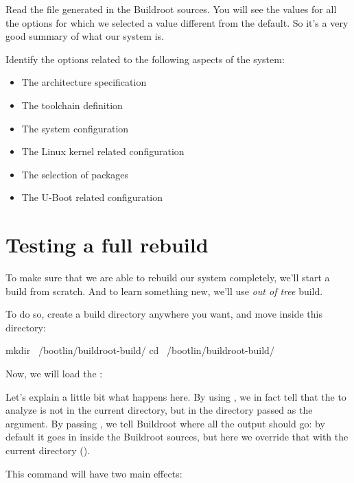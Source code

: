 Read the file  generated in the
Buildroot sources. You will see the values for all the options for
which we selected a value different from the default. So it's a very
good summary of what our system is.

Identify the options related to the following aspects of the system:

\begin{itemize}
\item The architecture specification
\item The toolchain definition
\item The system configuration
\item The Linux kernel related configuration
\item The selection of packages
\item The U-Boot related configuration
\end{itemize}

\section{Testing a full rebuild}

To make sure that we are able to rebuild our system completely, we'll
start a build from scratch. And to learn something new, we'll use {\em
  out of tree} build.

To do so, create a build directory anywhere you want, and move inside
this directory:

\begin{bashinput}
mkdir ~/bootlin/buildroot-build/
cd ~/bootlin/buildroot-build/
\end{bashinput}

Now, we will load the :


Let's explain a little bit what happens here. By using
, we in fact tell  that the
 to analyze is not in the current directory, but in the
directory passed as the  argument. By passing , we
tell Buildroot where all the output should go: by default it goes in
 inside the Buildroot sources, but here we override that
with the current directory ().

This command will have two main effects:

